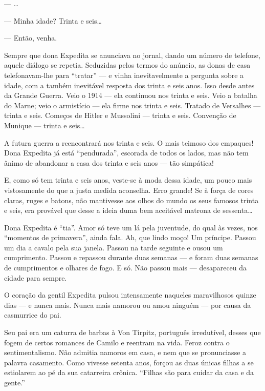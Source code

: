 
--- \ldots{}

--- Minha idade? Trinta e seis\ldots{}

--- Então, venha.

Sempre que dona Expedita se anunciava no jornal, dando um número de
telefone, aquele diálogo se repetia. Seduzidas pelos termos do anúncio,
as donas de casa telefonavam-lhe para ``tratar'' --- e vinha
inevitavelmente a pergunta sobre a idade, com a também inevitável
resposta dos trinta e seis anos. Isso desde antes da Grande Guerra. Veio
o 1914 --- ela continuou nos trinta e seis. Veio a batalha do Marne;
veio o armistício --- ela firme nos trinta e seis. Tratado de Versalhes
--- trinta e seis. Começos de Hitler e Mussolini --- trinta e seis.
Convenção de Munique --- trinta e seis\ldots{}

A futura guerra a reencontrará nos trinta e seis. O mais teimoso dos
empaques! Dona Expedita já está ``pendurada'', escorada de todos os
lados, mas não tem ânimo de abandonar a casa dos trinta e seis anos ---
tão simpática!

E, como só tem trinta e seis anos, veste-se à moda dessa idade, um pouco
mais vistosamente do que a justa medida aconselha. Erro grande! Se à
força de cores claras, ruges e batons, não mantivesse aos olhos do mundo
os seus famosos trinta e seis, era provável que desse a ideia duma bem
aceitável matrona de sessenta\ldots{}

Dona Expedita é ``tia''. Amor só teve um lá pela juventude, do qual às
vezes, nos ``momentos de primavera'', ainda fala. Ah, que lindo moço! Um
príncipe. Passou um dia a cavalo pela sua janela. Passou na tarde
seguinte e ousou um cumprimento. Passou e repassou durante duas semanas
--- e foram duas semanas de cumprimentos e olhares de fogo. E só. Não
passou mais --- desapareceu da cidade para sempre.

O coração da gentil Expedita pulsou intensamente naqueles maravilhosos
quinze dias --- e nunca mais. Nunca mais namorou ou amou ninguém --- por
causa da casmurrice do pai.

Seu pai era um caturra de barbas à Von Tirpitz, português irredutível,
desses que fogem de certos romances de Camilo e reentram na vida. Feroz
contra o sentimentalismo. Não admitia namoros em casa, e nem que se
pronunciasse a palavra casamento. Como vivesse setenta anos, forçou as
duas únicas filhas a se estiolarem ao pé da sua catarreira crônica.
``Filhas são para cuidar da casa e da gente.''

